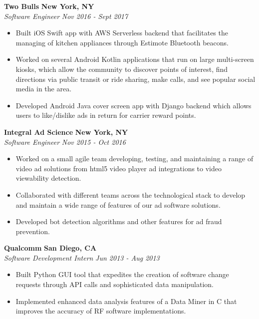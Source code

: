 \documentclass{res}
\begin{document}
\begin{resume}
{\bf Two Bulls} \hfill {\bf New York, NY} \\
{\textit {Software Engineer}} \hfill {\textit {Nov 2016 - Sept 2017}} 
\begin{itemize}
\renewcommand{\labelitemi}{\ding{117}}
\itemsep -2pt  
\item Built iOS Swift app with AWS Serverless backend that facilitates the managing of kitchen appliances through Estimote Bluetooth beacons. 
\item Worked on several Android Kotlin applications that run on large multi-screen kiosks, which allow the community to discover points of interest, find directions via public transit or ride sharing, make calls, and see popular social media in the area. 
\item Developed Android Java cover screen app with Django backend which allows users to like/dislike ads in return for carrier reward points.

\end{itemize}

{\bf Integral Ad Science} \hfill {\bf New York, NY} \\
{\textit {Software Engineer}} \hfill {\textit {Nov 2015 - Oct 2016}} 
\begin{itemize}
\renewcommand{\labelitemi}{\ding{117}}
\itemsep -2pt  
\item Worked on a small agile team developing, testing, and maintaining a range of video ad solutions from html5 video player ad integrations to video viewability detection.
\item Collaborated with different teams across the technological stack to develop and maintain a wide range of features of our ad software solutions.
\item Developed bot detection algorithms and other features for ad fraud prevention.

\end{itemize}

{\bf Qualcomm} \hfill {\bf San Diego, CA} \\
{\textit {Software Development Intern}} \hfill {\textit {Jun 2013 - Aug 2013}} 
\begin{itemize} 
\renewcommand{\labelitemi}{\ding{117}}
\itemsep -2pt  
\item Built Python GUI tool that expedites the creation of software 
	change requests through API calls and sophisticated data manipulation.
\item Implemented enhanced data analysis features of a Data Miner in C that
	 improves the accuracy of RF software implementations.
\end{itemize}


\end{resume}
\end{document}
